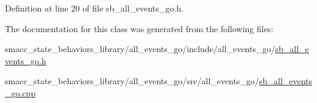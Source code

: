 Definition at line 20 of file sb\+\_\+all\+\_\+events\+\_\+go.\+h.



The documentation for this class was generated from the following files\+:\begin{DoxyCompactItemize}
\item 
smacc\+\_\+state\+\_\+behaviors\+\_\+library/all\+\_\+events\+\_\+go/include/all\+\_\+events\+\_\+go/\hyperlink{sb__all__events__go_8h}{sb\+\_\+all\+\_\+events\+\_\+go.\+h}\item 
smacc\+\_\+state\+\_\+behaviors\+\_\+library/all\+\_\+events\+\_\+go/src/all\+\_\+events\+\_\+go/\hyperlink{sb__all__events__go_8cpp}{sb\+\_\+all\+\_\+events\+\_\+go.\+cpp}\end{DoxyCompactItemize}
